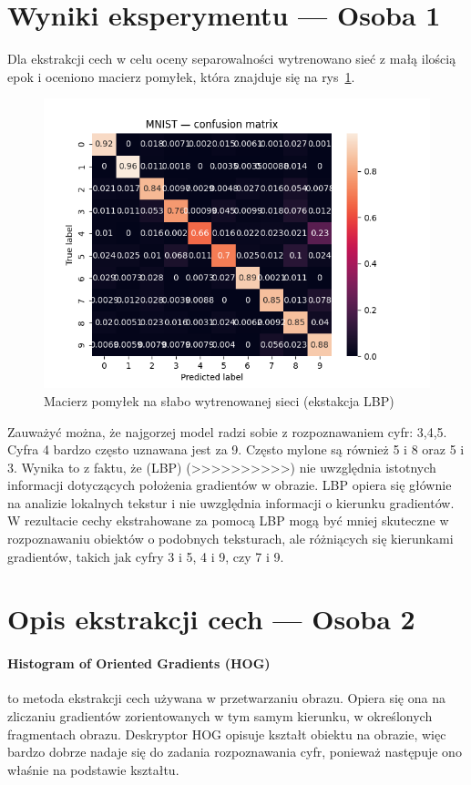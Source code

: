 \documentclass[10pt]{article}
\begin{document}
\pagebreak

\section{Wyniki eksperymentu --- Osoba 1}
Dla ekstrakcji cech w celu oceny separowalności wytrenowano sieć z małą ilością epok i oceniono macierz pomyłek, która znajduje się na rys~\ref{fig:lbp-bad-cm}.

\begin{figure}[H]\centering
    \includegraphics[width=.3\linewidth]{img/LBP/LBP_MLP}
    \caption{Macierz pomyłek na słabo wytrenowanej sieci (ekstakcja LBP)}\label{fig:lbp-bad-cm}
\end{figure}

Zauważyć można, że najgorzej model radzi sobie z rozpoznawaniem cyfr: 3,4,5.
Cyfra 4 bardzo często uznawana jest za 9.
Często mylone są również 5 i 8 oraz 5 i 3.
Wynika to z faktu, że (LBP) (>>>>>>>>>>)
nie uwzględnia istotnych informacji dotyczących położenia gradientów w obrazie. LBP opiera się głównie na analizie lokalnych tekstur i nie uwzględnia informacji o kierunku gradientów. W rezultacie cechy ekstrahowane za pomocą LBP mogą być mniej skuteczne w rozpoznawaniu obiektów o podobnych teksturach, ale różniących się kierunkami gradientów, takich jak cyfry 3 i 5, 4 i 9, czy 7 i 9.


\pagebreak

\section{Opis ekstrakcji cech --- Osoba 2}

\paragraph{Histogram of Oriented Gradients (HOG)} to metoda ekstrakcji cech używana w przetwarzaniu obrazu.
Opiera się ona na zliczaniu gradientów zorientowanych w tym samym kierunku, w określonych fragmentach obrazu.
Deskryptor HOG opisuje kształt obiektu na obrazie, więc bardzo dobrze nadaje się do zadania rozpoznawania cyfr, ponieważ następuje ono właśnie na podstawie kształtu.
\end{document}
